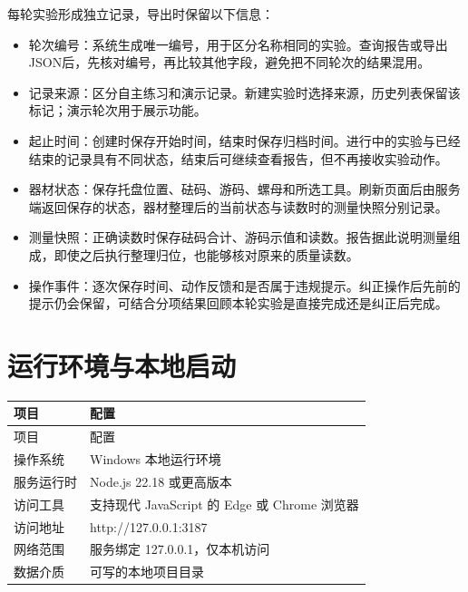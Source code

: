 \documentclass[UTF8,fontset=windows,zihao=-4]{ctexart}
\begin{document}
每轮实验形成独立记录，导出时保留以下信息：

\begin{itemize}

\item 轮次编号：系统生成唯一编号，用于区分名称相同的实验。查询报告或导出JSON后，先核对编号，再比较其他字段，避免把不同轮次的结果混用。

\item 记录来源：区分自主练习和演示记录。新建实验时选择来源，历史列表保留该标记；演示轮次用于展示功能。

\item 起止时间：创建时保存开始时间，结束时保存归档时间。进行中的实验与已经结束的记录具有不同状态，结束后可继续查看报告，但不再接收实验动作。

\item 器材状态：保存托盘位置、砝码、游码、螺母和所选工具。刷新页面后由服务端返回保存的状态，器材整理后的当前状态与读数时的测量快照分别记录。

\item 测量快照：正确读数时保存砝码合计、游码示值和读数。报告据此说明测量组成，即使之后执行整理归位，也能够核对原来的质量读数。

\item 操作事件：逐次保存时间、动作反馈和是否属于违规提示。纠正操作后先前的提示仍会保留，可结合分项结果回顾本轮实验是直接完成还是纠正后完成。

\end{itemize}

\section{运行环境与本地启动}

\begin{longtable}{@{}p{38mm}p{114mm}@{}}

\toprule

项目 & 配置 \\

\midrule

\endfirsthead

\toprule

项目 & 配置 \\

\midrule

\endhead

操作系统 & Windows 本地运行环境 \\

服务运行时 & Node.js 22.18 或更高版本 \\

访问工具 & 支持现代 JavaScript 的 Edge 或 Chrome 浏览器 \\

访问地址 & http://127.0.0.1:3187 \\

网络范围 & 服务绑定 127.0.0.1，仅本机访问 \\

数据介质 & 可写的本地项目目录 \\

\bottomrule

\end{longtable}
\end{document}
